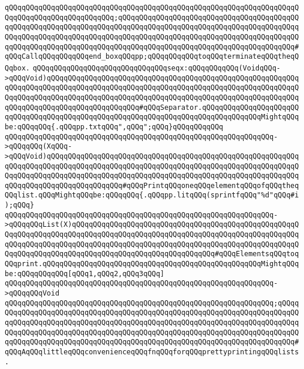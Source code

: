 \verb|qQQqqQQqqQQqqQQqqQQqqQQqqQQqqQQqqQQqqQQqqQQqqQQqqQQqqQQqqQQqqQQqqQQqqQQqqQQqqQQqqQQqqQQqqQQqqQQq;qQQqqQQqqQQqqQQqqQQqqQQqqQQqqQQqqQQqqQQqqQQqqQQqqQQqqQQqqQQqqQQqqQQqqQQqqQQqqQQqqQQqqQQqqQQqqQQqqQQqqQQqqQQqqQQqqQQqqQQqqQQqqQQqqQQqqQQqqQQqqQQqqQQqqQQqqQQqqQQqqQQqqQQqqQQqqQQqqQQqqQQqqQQqqQQqqQQqqQQqqQQqqQQqqQQqqQQqqQQqqQQqqQQqqQQqqQQqqQQqqQQqqQQqqQQq#qQQqCallqQQqqQQqqQQqend_boxqQQqpp;qQQqqQQqqQQqtoqQQqterminateqQQqtheqQQqbox.|\newline
\newline
\verb|qQQqqQQqqQQqqQQqqQQqqQQqqQQqqQQqseqx:qQQqqQQqqQQq(VoidqQQq->qQQqVoid)qQQqqQQqqQQqqQQqqQQqqQQqqQQqqQQqqQQqqQQqqQQqqQQqqQQqqQQqqQQqqQQqqQQqqQQqqQQqqQQqqQQqqQQqqQQqqQQqqQQqqQQqqQQqqQQqqQQqqQQqqQQqqQQqqQQqqQQqqQQqqQQqqQQqqQQqqQQqqQQqqQQqqQQqqQQqqQQqqQQqqQQqqQQqqQQqqQQqqQQqqQQqqQQqqQQqqQQqqQQqqQQqqQQqqQQq#qQQqSeparator.qQQqqQQqqQQqqQQqqQQqqQQqqQQqqQQqqQQqqQQqqQQqqQQqqQQqqQQqqQQqqQQqqQQqqQQqqQQqqQQqqQQqMightqQQqbe:qQQqqQQq{.qQQqpp.txtqQQq",qQQq";qQQq}qQQqqQQqqQQq|\newline
\verb|qQQqqQQqqQQqqQQqqQQqqQQqqQQqqQQqqQQqqQQqqQQqqQQqqQQqqQQqqQQqqQQq->qQQqqQQq(XqQQq->qQQqVoid)qQQqqQQqqQQqqQQqqQQqqQQqqQQqqQQqqQQqqQQqqQQqqQQqqQQqqQQqqQQqqQQqqQQqqQQqqQQqqQQqqQQqqQQqqQQqqQQqqQQqqQQqqQQqqQQqqQQqqQQqqQQqqQQqqQQqqQQqqQQqqQQqqQQqqQQqqQQqqQQqqQQqqQQqqQQqqQQqqQQqqQQqqQQqqQQqqQQqqQQqqQQqqQQqqQQqqQQqqQQqqQQqqQQq#qQQqPrintqQQqoneqQQqelementqQQqofqQQqtheqQQqlist.qQQqMightqQQqbe:qQQqqQQq{.qQQqpp.litqQQq(sprintfqQQq"%d"qQQq#i);qQQq}|\newline
\verb|qQQqqQQqqQQqqQQqqQQqqQQqqQQqqQQqqQQqqQQqqQQqqQQqqQQqqQQqqQQqqQQq->qQQqqQQqList(X)qQQqqQQqqQQqqQQqqQQqqQQqqQQqqQQqqQQqqQQqqQQqqQQqqQQqqQQqqQQqqQQqqQQqqQQqqQQqqQQqqQQqqQQqqQQqqQQqqQQqqQQqqQQqqQQqqQQqqQQqqQQqqQQqqQQqqQQqqQQqqQQqqQQqqQQqqQQqqQQqqQQqqQQqqQQqqQQqqQQqqQQqqQQqqQQqqQQqqQQqqQQqqQQqqQQqqQQqqQQqqQQqqQQqqQQqqQQqqQQqqQQq#qQQqElementsqQQqtoqQQqprint.qQQqqQQqqQQqqQQqqQQqqQQqqQQqqQQqqQQqqQQqqQQqqQQqqQQqMightqQQqbe:qQQqqQQqqQQq[qQQq1,qQQq2,qQQq3qQQq]|\newline
\verb|qQQqqQQqqQQqqQQqqQQqqQQqqQQqqQQqqQQqqQQqqQQqqQQqqQQqqQQqqQQqqQQq->qQQqqQQqVoid|\newline
\verb|qQQqqQQqqQQqqQQqqQQqqQQqqQQqqQQqqQQqqQQqqQQqqQQqqQQqqQQqqQQqqQQq;qQQqqQQqqQQqqQQqqQQqqQQqqQQqqQQqqQQqqQQqqQQqqQQqqQQqqQQqqQQqqQQqqQQqqQQqqQQqqQQqqQQqqQQqqQQqqQQqqQQqqQQqqQQqqQQqqQQqqQQqqQQqqQQqqQQqqQQqqQQqqQQqqQQqqQQqqQQqqQQqqQQqqQQqqQQqqQQqqQQqqQQqqQQqqQQqqQQqqQQqqQQqqQQqqQQqqQQqqQQqqQQqqQQqqQQqqQQqqQQqqQQqqQQqqQQqqQQqqQQqqQQqqQQqqQQqqQQqqQQqqQQq#qQQqAqQQqlittleqQQqconvenienceqQQqfnqQQqforqQQqprettyprintingqQQqlists.|\newline
